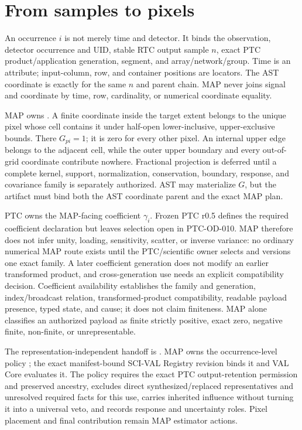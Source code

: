 \documentclass[10pt]{article}
\begin{document}
\clearpage
\section{From samples to pixels}\label{sec:samples}
An occurrence \(i\) is not merely time and detector. It binds the observation,
detector occurrence and UID, stable RTC output sample \(n\), exact PTC
product/application generation, segment, and array/network/group. Time is an
attribute; input-column, row, and container positions are locators. The AST
coordinate is exactly \SCIMapASTRTCGridProfile{} for the
same \(n\) and parent chain. MAP never joins signal and coordinate by time,
row, cardinality, or numerical coordinate equality.

MAP owns \SCIMapOneHotProfile. A finite coordinate inside
the target extent belongs to the unique pixel whose cell contains it under
half-open lower-inclusive, upper-exclusive bounds. There \(G_{pi}=1\); it is
zero for every other pixel. An internal upper edge belongs to the adjacent
cell, while the outer upper boundary and every out-of-grid coordinate
contribute nowhere. Fractional projection is deferred until a complete
kernel, support, normalization, conservation, boundary, response, and
covariance family is separately authorized. AST may materialize \(G\), but the
artifact must bind both the AST coordinate parent and the exact MAP plan.

PTC owns the MAP-facing coefficient \(\gamma_i\). Frozen PTC r0.5 defines the
required coefficient declaration but leaves selection open in PTC-OD-010.
MAP therefore does not infer unity, loading, sensitivity, scatter, or inverse
variance: no ordinary numerical MAP route exists until the PTC/scientific
owner selects and versions one exact family. A later coefficient generation
does not modify an earlier transformed product, and cross-generation use needs
an explicit compatibility decision. Coefficient availability establishes the
family and generation, index/broadcast relation, transformed-product
compatibility, readable payload presence, typed state, and cause; it does not
claim finiteness. MAP alone classifies an authorized payload as finite
strictly positive, exact zero, negative finite, non-finite, or unrepresentable.

The representation-independent handoff is
\SCIMapPTCMapBoundaryId. MAP owns the occurrence-level policy
\SCIMapUpstreamProfile; the exact manifest-bound SCI-VAL Registry revision binds it
and VAL Core evaluates it. The policy requires the exact PTC output-retention
permission and preserved ancestry, excludes direct synthesized/replaced
representatives and unresolved required facts for this use, carries inherited
influence without turning it into a universal veto, and records response and
uncertainty roles. Pixel placement and final contribution remain MAP
estimator actions.
\end{document}
